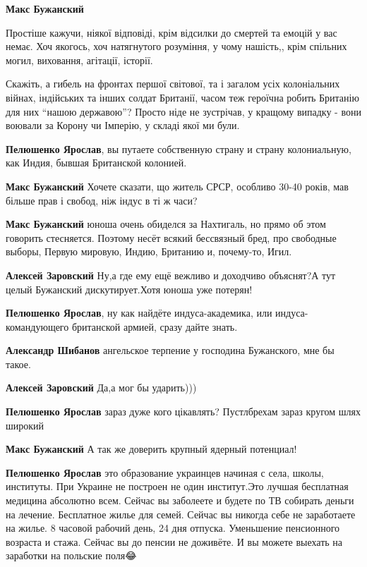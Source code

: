 \begin{itemize}
\begin{itemize}
\begin{itemize}
\textbf{Макс Бужанский} 

Простіше кажучи, ніякої відповіді, крім відсилки до смертей та емоцій у вас
немає. Хоч якогось, хоч натягнутого розуміння, у чому нашість,, крім спільних
могил, виховання, агітації, історії.

Скажіть, а гибель на фронтах першої світової, та і загалом усіх колоніальних
війнах, індійських та інших солдат Британії, часом теж героїчна робить Британію
для них \enquote{нашою державою}? Просто ніде не зустрічав, у кращому випадку - вони
воювали за Корону чи Імперію, у складі якої ми були.

\textbf{Пелюшенко Ярослав}, вы путаете собственную страну и страну колониальную, как Индия, бывшая Британской колонией.

\textbf{Макс Бужанский} Хочете сказати, що житель СРСР, особливо 30-40 років, мав більше прав і свобод, ніж індус в ті ж часи?

\textbf{Макс Бужанский} юноша очень обиделся за Нахтигаль, но прямо об этом говорить стесняется. Поэтому несёт всякий бессвязный бред, про свободные выборы, Первую мировую, Индию, Британию и, почему-то, Игил.

\textbf{Алексей Заровский} Ну,а где ему ещё вежливо и доходчиво объяснят?А тут целый Бужанский дискутирует.Хотя юноша уже потерян!

\textbf{Пелюшенко Ярослав}, ну как найдёте индуса-академика, или индуса- командующего британской армией, сразу дайте знать.

\textbf{Александр Шибанов} ангельское терпение у господина Бужанского, мне бы такое.

\textbf{Алексей Заровский} Да,а мог бы ударить)))

\textbf{Пелюшенко Ярослав} зараз дуже кого цікавлять? Пустлбрехам зараз кругом шлях широкий

\textbf{Макс Бужанский} А так же доверить крупный ядерный потенциал!


\textbf{Пелюшенко Ярослав} это образование украинцев начиная с села, школы,
институты. При Украине не построен не один институт.Это лучшая бесплатная
медицина абсолютно всем. Сейчас вы заболеете и будете по ТВ собирать деньги на
лечение. Бесплатное жилье для семей. Сейчас вы никогда себе не заработаете на
жилье. 8 часовой рабочий день, 24 дня отпуска. Уменьшение пенсионного возраста
и стажа. Сейчас вы до пенсии не доживёте. И вы можете выехать на заработки на
польские поля😂


\end{itemize}
\end{itemize}
\end{itemize}
